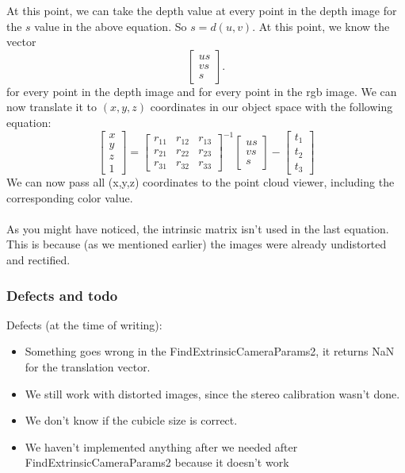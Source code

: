 At this point, we can take the depth value at every point in the depth image for
the $s$ value in the above equation. So $s = d(u,v)$. At this point, we know
the vector $$
\left[ \begin{array}{ccc} 
u s\\
v s\\
s \end{array} \right].
$$ for every point in the depth image and for every point in the rgb image. We 
can now translate it to $(x,y,z)$ coordinates in our object space with the 
following equation:
$$
\left[ \begin{array}{c} 
x\\
y\\
z\\
1  \end{array} \right] 
=
\left[ \begin{array}{ccc} 
r_{11} & r_{12} & r_{13}\\
r_{21} & r_{22} & r_{23}\\
r_{31} & r_{32} & r_{33}
\end{array} \right]^{-1}
\left[ \begin{array}{c} 
u s\\
v s\\
s \end{array} \right]
-
\left[ \begin{array}{c} 
t_{1}\\
t_{2}\\
t_{3}
\end{array} \right]
$$
We can now pass all (x,y,z) coordinates to the point cloud viewer, including 
the corresponding color value. \\
\\
As you might have noticed, the intrinsic matrix isn't used in the last equation.
This is because (as we mentioned earlier) the images were already undistorted
and rectified.

\subsubsection{Defects and todo}

Defects (at the time of writing):

\begin{itemize}

\item Something goes wrong in the FindExtrinsicCameraParams2, it returns NaN for the translation vector.

\item We still work with distorted images, since the stereo calibration wasn't done.

\item We don't know if the cubicle size is correct.

\item We haven't implemented anything after we needed after FindExtrinsicCameraParams2 because it doesn't work

\end{itemize}

